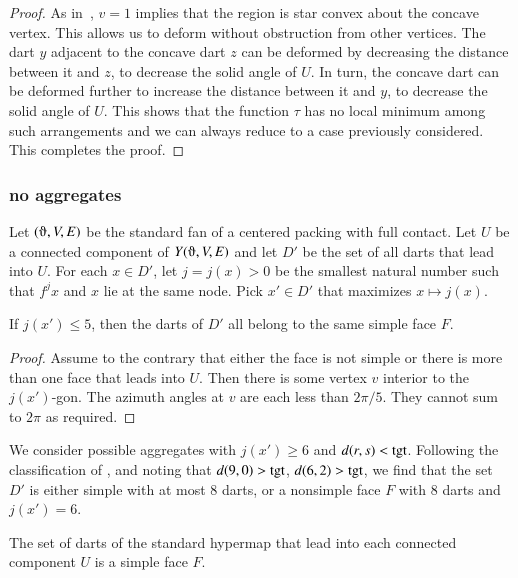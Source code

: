 \begin{proof}
As in~\cite{hales:2006:DCG}, $v=1$ implies that the region is star convex about the concave vertex.  This allows us to deform without obstruction from other vertices.  The dart $y$ adjacent to the concave dart $z$ can be deformed by decreasing the distance between it and $z$, to decrease the solid angle of $U$.  In turn, the concave dart can be deformed further to increase the distance between it and $y$, to decrease the solid angle of $U$.  This shows that the function $\tau$ has no local minimum among such arrangements and we can always reduce to a case previously considered.  This completes the proof.
\end{proof}

\subsubsection{no aggregates}

Let $(\orgn,V,E)$ be the standard fan of a centered packing with full contact.  Let $U$ be a connected component of $Y(\orgn,V,E)$ and let $D'$ be the set of all darts that lead into $U$.  For each $x\in D'$, let $j = j(x) >0$ be the smallest natural number such that $f^j x$ and $x$ lie at the same node.  Pick $x'\in D'$ that maximizes $x\mapsto j(x)$.  

\begin{lemma}\label{lemma:DU}  If $j(x')\le 5$, then the darts of $D'$ all belong to the same simple face $F$.
\end{lemma}

\begin{proof} Assume to the contrary that either the face is not simple or there is more than one face that leads into $U$.  Then there is some vertex $v$ interior to the $j(x')$-gon.  The azimuth angles at $v$ are each less than $2\pi/5$. They cannot sum to $2\pi$ as required.
\end{proof}

We consider possible aggregates with $j(x')\ge 6$ and $d(r,s)<{\operatorname{tgt}}$.
Following the classification of \cite[p.~126,~Fig.~12.1]{hales:2006:DCG}, and noting that $d(9,0) > {\operatorname{tgt}}$, $d(6,2) > {\operatorname{tgt}}$, we find that the set $D'$
is either simple with at most $8$ darts, or a nonsimple face $F$ with $8$ darts and $j(x')=6$.

\begin{lemma}\label{lemma:simple} The set of darts of the standard hypermap that lead into each connected component $U$ is a simple face $F$.
\end{lemma}

